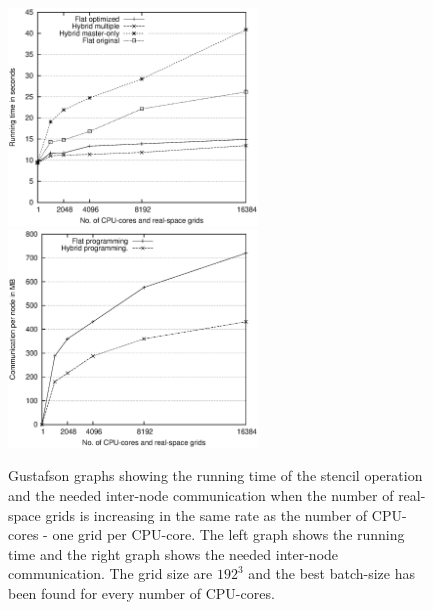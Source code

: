 \documentclass[preprint,3p,times,twocolumn]{elsarticle}
\begin{document}
\begin{figure}
\centerline{
\mbox{\includegraphics[width=250px]{gfx/fidi_gustavson}}
\mbox{\includegraphics[width=250px]{gfx/fidi_gustavson_comm}}
} 
 \caption{Gustafson graphs showing the running time of the stencil operation and the needed inter-node communication when the number of real-space grids is increasing in the same rate as the number of CPU-cores - one grid per CPU-core. The left graph shows the running time and the right graph shows the needed inter-node communication. The grid size are $192^3$ and the best batch-size has been found for every number of CPU-cores. }
 \label{fig:gustafson}
\end{figure}
\end{document}
